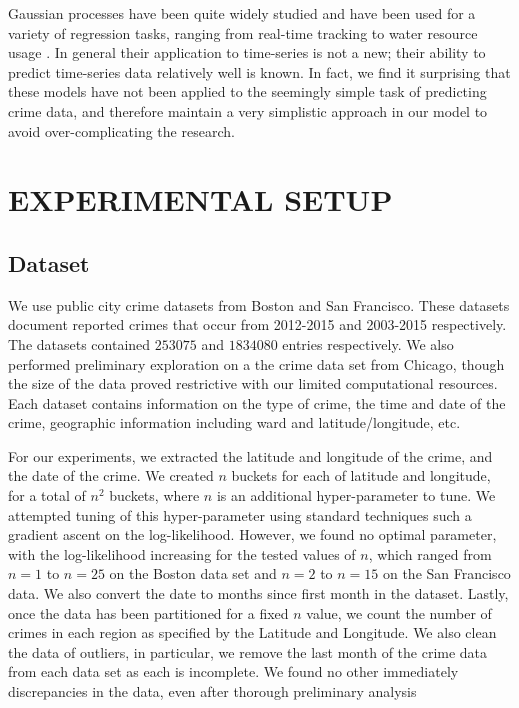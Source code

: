 \documentclass[letterpaper, 11 pt, conference]{ieeeconf}  %
\begin{document}
Gaussian processes have been quite widely studied \cite{c1} and have been used for a variety of regression tasks, ranging from real-time tracking \cite{c9} to water resource usage \cite{c10}. In general their application to time-series is not a new; their ability to predict time-series data relatively well is known. In fact, we find it surprising that these models have not been applied to the seemingly simple task of predicting crime data, and therefore maintain a very simplistic approach in our model to avoid over-complicating the research. 

\section{EXPERIMENTAL SETUP}

\subsection{Dataset}

We use public city crime datasets from Boston and San Francisco. These datasets document reported crimes that occur from 2012-2015 and 2003-2015 respectively. The datasets contained $253075$ and $1834080$ entries respectively. We also performed preliminary exploration on a the crime data set from Chicago, though the size of the data proved restrictive with our limited computational resources. Each dataset contains information on the type of crime, the time and date of the crime, geographic information including ward and latitude/longitude, etc. 

For our experiments, we extracted the latitude and longitude of the crime, and the date of the crime. We created $n$ buckets for each of latitude and longitude, for a total of $n^2$ buckets, where $n$ is an additional hyper-parameter to tune. We attempted tuning of this hyper-parameter using standard techniques such a gradient ascent on the log-likelihood. However, we found no optimal parameter, with the log-likelihood increasing for the tested values of $n$, which ranged from $n = 1$ to $n = 25$ on the Boston data set and $n = 2$ to $n = 15$ on the San Francisco data. We also convert the date to months since first month in the dataset. Lastly, once the data has been partitioned for a fixed $n$ value, we count the number of crimes in each region as specified by the Latitude and Longitude. We also clean the data of outliers, in particular, we remove the last month of the crime data from each data set as each is incomplete. We found no other immediately discrepancies in the data, even after thorough preliminary analysis  
\end{document}
